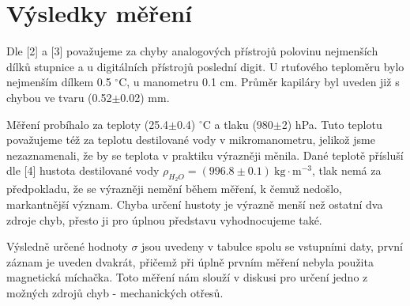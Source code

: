 \documentclass[a4paper]{article}
\begin{document}
\section*{Výsledky měření}
\par Dle [2] a [3] považujeme za chyby analogových přístrojů polovinu nejmenších dílků stupnice a u digitálních přístrojů poslední digit. U rtuťového teploměru bylo nejmenším dílkem 0.5 $^\circ$C, u manometru 0.1 cm. Průměr kapiláry byl uveden již s chybou ve tvaru (0.52$\pm$0.02) mm.
\par Měření probíhalo za teploty (25.4$\pm$0.4) $^\circ$C a tlaku (980$\pm$2) hPa. Tuto teplotu považujeme též za teplotu destilované vody v mikromanometru, jelikož jsme nezaznamenali, že by se teplota v praktiku výrazněji měnila. Dané teplotě přísluší dle [4] hustota destilované vody $\rho_{H_{2}O} = (996.8\pm0.1)\: \mathrm{kg \cdot m^{-3}}$, tlak nemá za předpokladu, že se výrazněji nemění během měření, k čemuž nedošlo, markantnější význam. Chyba určení hustoty je výrazně menší než ostatní dva zdroje chyb, přesto ji pro úplnou představu vyhodnocujeme také.
\par Výsledně určené hodnoty $\sigma$ jsou uvedeny v tabulce spolu se vstupními daty, první záznam je uveden dvakrát, přičemž při úplně prvním měření nebyla použita magnetická míchačka. Toto měření nám slouží v diskusi pro určení jedno z možných zdrojů chyb - mechanických otřesů.
\end{document}
